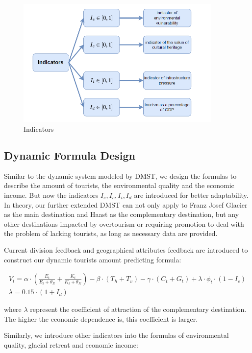 \documentclass{mcmthesis}
\begin{document}
\begin{figure}[H]
  \centering
  \includegraphics[width=0.9\textwidth]{figures/indicators.png}
  \caption{Indicators}
  \label{Fig.XXXX}
\end{figure}

\subsection{Dynamic Formula Design}
Similar to the dynamic system modeled by DMST, we design the formulas to describe the amount of tourists, 
the environmental quality and the economic income. But now the indicators $I_e, I_c, I_i, I_d$ are introduced
for better adaptability. In theory, our further extended DMST can not only apply to Franz Josef Glacier
as the main destination and Haast as the complementary destination, but any other destinations impacted by 
overtourism or requiring promotion to deal with the problem of lacking tourists, as long as necessary data are provided.

Current division feedback and geographical attributes feedback are introduced to construct our dynamic tourists amount predicting formula:

\begin{gather}
  V_t = \alpha \cdot \left(\frac{E_t}{E_t + \theta_E} + \frac{K_t}{K_t + \theta_K} \right) - \beta \cdot (T_h + T_v)
  - \gamma \cdot (C_t + G_t) + \lambda \cdot \phi_t \cdot (1 - I_c) \\
  \lambda = 0.15 \cdot (1 + I_d)
\end{gather}

where $\lambda$ represent the coefficient of attraction of the complementary destination. The higher the economic dependence is,
this coefficient is larger.

Similarly, we introduce other indicators into the formulas of environmental quality, glacial retreat and economic income:
\end{document}
